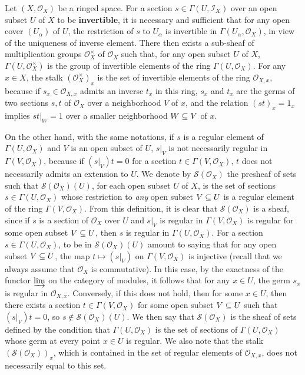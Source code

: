 Let $(X,\mathscr{O}_X)$ be a ringed space. For a section $s\in\Gamma(U,\mathscr{I}_X)$ over an open subset $U$ of $X$ to be \textbf{invertible}, it is necessary and sufficient that for any open cover $(U_\alpha)$ of $U$, the restriction of $s$ to $U_\alpha$ is invertible in $\Gamma(U_\alpha,\mathscr{O}_X)$, in view of the uniqueness of inverse element. There then exists a sub-sheaf of multiplication groups $\mathscr{O}_X^{\times}$ of $\mathscr{O}_X$ such that, for any open subset $U$ of $X$, $\Gamma(U,\mathscr{O}_X^{\times})$ is the group of invertible elements of the ring $\Gamma(U,\mathscr{O}_X)$. For any $x\in X$, the stalk $(\mathscr{O}_X^{\times})_x$ is the set of invertible elements of the ring $\mathscr{O}_{X,x}$, because if $s_x\in\mathscr{O}_{X,x}$ admits an inverse $t_x$ in this ring, $s_x$ and $t_x$ are the germs of two sections $s,t$ of $\mathscr{O}_X$ over a neighborhood $V$ of $x$, and the relation $(st)_x=1_x$ implies $st|_W=1$ over a smaller neighborhood $W\subseteq V$ of $x$.\par
On the other hand, with the same notations, if $s$ is a regular element of $\Gamma(U,\mathscr{O}_X)$ and $V$ is an open subset of $U$, $s|_V$ is not necessarily regular in $\Gamma(V,\mathscr{O}_X)$, because if $(s|_V)t=0$ for a section $t\in\Gamma(V,\mathscr{O}_X)$, $t$ does not necessarily admits an extension to $U$. We denote by $\mathscr{S}(\mathscr{O}_X)$ the presheaf of sets such that $\mathscr{S}(\mathscr{O}_X)(U)$, for each open subset $U$ of $X$, is the set of sections $s\in\Gamma(U,\mathscr{O}_X)$ whose restriction to \textit{any} open subset $V\subseteq U$ is a regular element of the ring $\Gamma(V,\mathscr{O}_X)$. From this definition, it is clear that $\mathscr{S}(\mathscr{O}_X)$ is a sheaf, since if $s$ is a section of $\mathscr{O}_X$ over $U$ and $s|_V$ is regular in $\Gamma(V,\mathscr{O}_X)$ is regular for some open subset $V\subseteq U$, then $s$ is regular in $\Gamma(U,\mathscr{O}_X)$. For a section $s\in\Gamma(U,\mathscr{O}_X)$, to be in $\mathscr{S}(\mathscr{O}_X)(U)$ amount to saying that for any open subset $V\subseteq U$, the map $t\mapsto(s|_V)$ on $\Gamma(V,\mathscr{O}_X)$ is injective (recall that we always assume that $\mathscr{O}_X$ is commutative). In this case, by the exactness of the functor $\varinjlim\limits$ on the category of modules, it follows that for any $x\in U$, the germ $s_x$ is regular in $\mathscr{O}_{X,x}$. Conversely, if this does not hold, then for some $x\in U$, then there exists a section $t\in\Gamma(V,\mathscr{O}_X)$ for some open subset $V\subseteq U$ such that $(s|_V)t=0$, so $s\notin\mathscr{S}(\mathscr{O}_X)(U)$. We then say that $\mathscr{S}(\mathscr{O}_X)$ is the sheaf of sets defined by the condition that $\Gamma(U,\mathscr{O}_X)$ is the set of sections of $\Gamma(U,\mathscr{O}_X)$ whose germ at every point $x\in U$ is regular. We also note that the stalk $(\mathscr{S}(\mathscr{O}_X))_x$, which is contained in the set of regular elements of $\mathscr{O}_{X,x}$, does not necessarily equal to this set.\par
